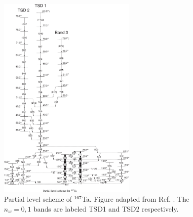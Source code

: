 \begin{figure}[ht!]
\centerline{\includegraphics[width=0.6\textwidth]{./img/c4/167Ta_scheme.png}}
	\caption{Partial level scheme of $^{167}$Ta. Figure adapted from Ref. \cite{wobblingIn167Ta}. The $n_w=0,1$ bands are labeled TSD1 and TSD2 respectively.\label{fig:chp4-last-wobb}}
\end{figure}

